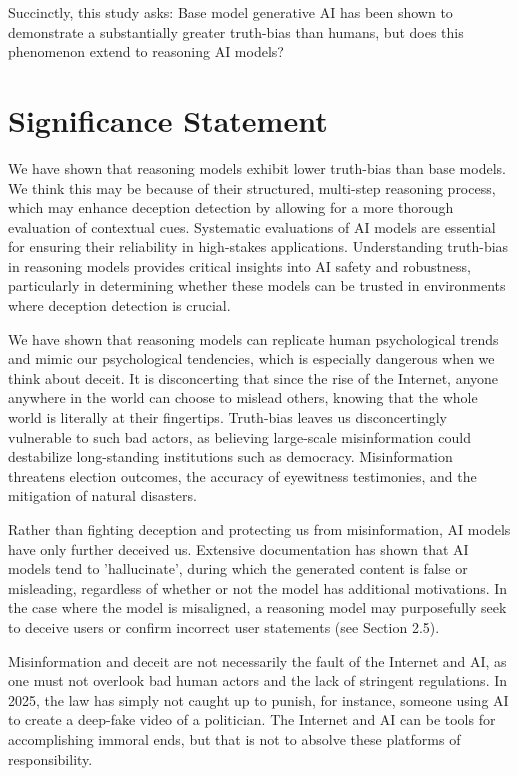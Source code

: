 \documentclass{article}
\begin{document}
Succinctly, this study asks: Base model generative AI has been shown to demonstrate a substantially greater truth-bias than humans, but does this phenomenon extend to reasoning AI models?

\section{Significance Statement}

We have shown that reasoning models exhibit lower truth-bias than base models. We think this may be because of their structured, multi-step reasoning process, which may enhance deception detection by allowing for a more thorough evaluation of contextual cues. Systematic evaluations of AI models are essential for ensuring their reliability in high-stakes applications. Understanding truth-bias in reasoning models provides critical insights into AI safety and robustness, particularly in determining whether these models can be trusted in environments where deception detection is crucial.

We have shown that reasoning models can replicate human psychological trends and mimic our psychological tendencies, which is especially dangerous when we think about deceit. It is disconcerting that since the rise of the Internet, anyone anywhere in the world can choose to mislead others, knowing that the whole world is literally at their fingertips. Truth-bias leaves us disconcertingly vulnerable to such bad actors, as believing large-scale misinformation could destabilize long-standing institutions such as democracy. Misinformation threatens election outcomes, the accuracy of eyewitness testimonies, and the mitigation of natural disasters. 

Rather than fighting deception and protecting us from misinformation, AI models have only further deceived us. Extensive documentation has shown that AI models tend to 'hallucinate', during which the generated content is false or misleading, regardless of whether or not the model has additional motivations. In the case where the model is misaligned, a reasoning model may purposefully seek to deceive users or confirm incorrect user statements (see Section 2.5). 

Misinformation and deceit are not necessarily the fault of the Internet and AI, as one must not overlook bad human actors and the lack of stringent regulations. In 2025, the law has simply not caught up to punish, for instance, someone using AI to create a deep-fake video of a politician. The Internet and AI can be tools for accomplishing immoral ends, but that is not to absolve these platforms of responsibility.
\end{document}
